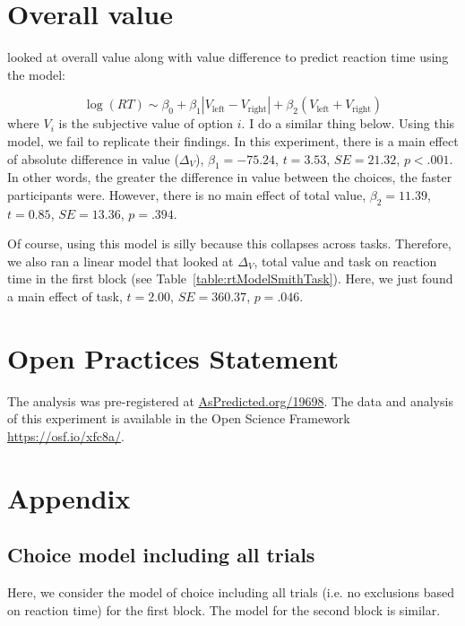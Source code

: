 \documentclass[12pt]{article}
\begin{document}
\clearpage
\section{Overall value}

 looked at overall value along with value difference to predict reaction time using the model:

\begin{equation}
	\log(RT) \sim \beta_0 + \beta_1|V_\text{left} - V_\text{right}| + \beta_2(V_\text{left} + V_\text{right})
\end{equation}
where $V_i$ is the subjective value of option $i$. I do a similar thing below. Using this model, we fail to replicate their findings. In this experiment, there is a main effect of absolute difference in value ($\Delta_V$), $\beta_1=-75.24$, $t=3.53$, $SE=21.32$, $p<.001$. In other words, the greater the difference in value between the choices, the faster participants were. However, there is no main effect of total value, $\beta_2=11.39$, $t=0.85$, $SE=13.36$, $p=.394$.



Of course, using this model is silly because this collapses across tasks. Therefore, we also ran a linear model that looked at $\Delta_V$, total value and task on reaction time in the first block (see Table~\ref{table:rtModelSmithTask}). Here, we just found a main effect of task, $t=2.00$, $SE=360.37$, $p=.046$.


\clearpage
\section{Open Practices Statement}
The analysis was pre-registered at \url{AsPredicted.org/19698}. The data and analysis of this experiment is available in the Open Science Framework \url{https://osf.io/xfc8a/}. 




\clearpage
\section{Appendix}
\subsection{Choice model including all trials}
Here, we consider the model of choice including all trials (i.e. no exclusions based on reaction time) for the first block. The model for the second block is similar. 
\end{document}
